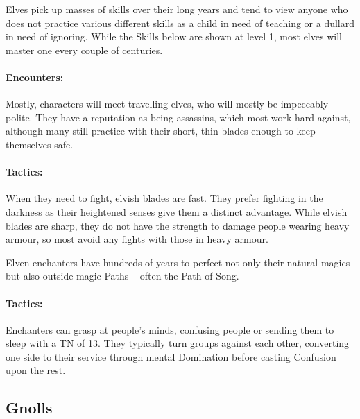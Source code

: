 \begin{multicols}{2}
\begin{itemize}
\end{itemize}

\label{elf}

Elves pick up masses of skills over their long years and tend to view anyone who does not practice various different skills as a child in need of teaching or a dullard in need of ignoring.  While the Skills below are shown at level 1, most elves will master one every couple of centuries.

\paragraph{Encounters:} Mostly, characters will meet travelling elves, who will mostly be impeccably polite.
They have a reputation as being assassins, which most work hard against, although many still practice with their short, thin blades enough to keep themselves safe.

\paragraph{Tactics:} When they need to fight, elvish blades are fast.
They prefer fighting in the darkness as their heightened senses give them a distinct advantage.
While elvish blades are sharp, they do not have the strength to damage people wearing heavy armour, so most avoid any fights with those in heavy armour.


\label{elven_enchanter}

Elven enchanters have hundreds of years to perfect not only their natural magics but also outside magic Paths -- often the Path of Song.


\paragraph{Tactics:} Enchanters can grasp at people's minds, confusing people or sending them to sleep with a TN of 13.
They typically turn groups against each other, converting one side to their service through mental Domination before casting Confusion upon the rest.

\subsection{Gnolls}


\end{multicols}

